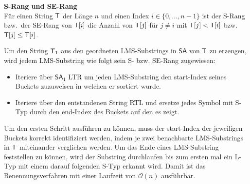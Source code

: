 \begin{definition}\textbf{S-Rang und SE-Rang}\\
Für einen String $\inputtext$ der Länge $n$ und einen Index $i \in \{0, \ldots, n-1\}$ ist der S-Rang bzw.\ der SE-Rang von $\inputtext[i]$ die Anzahl von $\inputtext[j]$ für $j \neq i$ mit $\inputtext[j] < \inputtext[i]$ bzw.\ $\inputtext[j] \leq \inputtext[i]$. 
\end{definition}

Um den String $\inputtext_1$ aus den geordneten LMS-Substrings in $\mathsf{SA}$ von $\inputtext$ zu erzeugen, wird jedem LMS-Substring wie folgt sein S- bzw. SE-Rang zugewiesen:

\begin{itemize}
\item Iteriere über $\mathsf{SA}_1$ LTR um jeden LMS-Substring den start-Index seines Buckets zuzuweisen in welchen er sortiert wurde.
\item Iteriere über den entstandenen String RTL und ersetze jedes Symbol mit S-Typ durch den end-Index des Buckets auf den es zeigt.
\end{itemize}

Um den ersten Schritt ausführen zu können, muss der start-Index der jeweiligen Buckets korrekt identifiziert werden, indem je zwei benachbarte LMS-Substrings in $\inputtext$ miteinander verglichen werden. Um das Ende eines LMS-{Sub\-string} feststellen zu können, wird der Substring durchlaufen bis zum ersten mal ein L-Typ mit einem darauf folgenden S-Typ erkannt wird. Damit ist das Benennungsverfahren mit einer Laufzeit von $\mathcal O(n)$ ausführbar.
